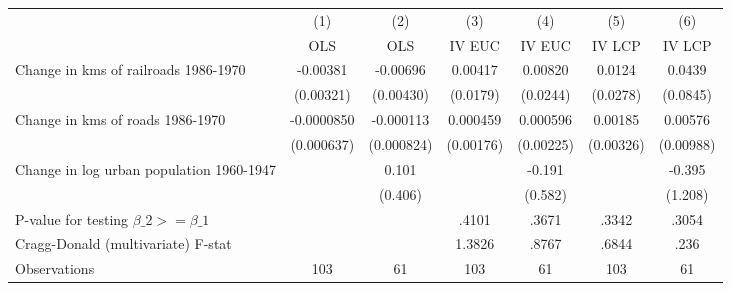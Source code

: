 {
\def\sym#1{\ifmmode^{#1}\else\(^{#1}\)\fi}
\begin{tabular}{l*{6}{c}}
\hline\hline
                &\multicolumn{1}{c}{(1)}&\multicolumn{1}{c}{(2)}&\multicolumn{1}{c}{(3)}&\multicolumn{1}{c}{(4)}&\multicolumn{1}{c}{(5)}&\multicolumn{1}{c}{(6)}\\
                &\multicolumn{1}{c}{OLS}&\multicolumn{1}{c}{OLS}&\multicolumn{1}{c}{IV EUC}&\multicolumn{1}{c}{IV EUC}&\multicolumn{1}{c}{IV LCP}&\multicolumn{1}{c}{IV LCP}\\
\hline
Change in kms of railroads 1986-1970& -0.00381         & -0.00696         &  0.00417         &  0.00820         &   0.0124         &   0.0439         \\
                &(0.00321)         &(0.00430)         & (0.0179)         & (0.0244)         & (0.0278)         & (0.0845)         \\
[1em]
Change in kms of roads 1986-1970&-0.0000850         &-0.000113         & 0.000459         & 0.000596         &  0.00185         &  0.00576         \\
                &(0.000637)         &(0.000824)         &(0.00176)         &(0.00225)         &(0.00326)         &(0.00988)         \\
[1em]
Change in log urban population 1960-1947&                  &    0.101         &                  &   -0.191         &                  &   -0.395         \\
                &                  &  (0.406)         &                  &  (0.582)         &                  &  (1.208)         \\
\hline
P-value for testing $\beta\_{2} >= \beta\_{1}$&                  &                  &    .4101         &    .3671         &    .3342         &    .3054         \\
Cragg-Donald (multivariate) F-stat&                  &                  &   1.3826         &    .8767         &    .6844         &     .236         \\
Observations    &      103         &       61         &      103         &       61         &      103         &       61         \\
\hline\hline
\end{tabular}
}
